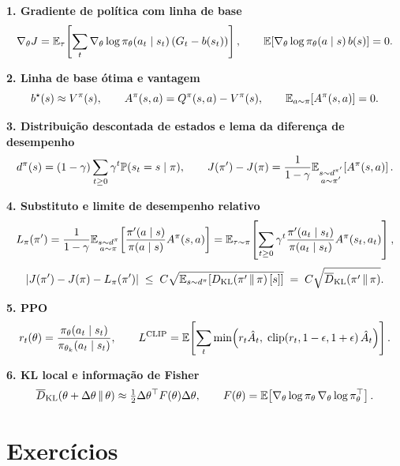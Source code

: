 \documentclass[11pt, a4paper]{article}
\newcommand{\Adv}{A}
\newcommand{\Ahat}{\hat{A}}
\newcommand{\polnovo}{\pol'}
\newcommand{\dpol}{d^{\pol}}
\newcommand{\dpolnovo}{d^{\pol'}}
\newcommand{\KLd}[2]{D_{\mathrm{KL}}\!\left(#1\,\|\,#2\right)}
\newcommand{\KLbar}{\overline{D}_{\mathrm{KL}}}
\DeclareMathOperator{\clipop}{clip}
\newcommand{\Lsub}[1]{L_{#1}}
\begin{document}
\begin{tcolorbox}[enhanced, colback=rlFundo, colframe=rlAzul!25, boxrule=0.8pt,
  arc=1.6mm, left=3mm, right=3mm, top=2.4mm, bottom=2.4mm, breakable]
\textbf{1. Gradiente de política com linha de base}
\[
  \nabla_\theta J = \mathbb{E}_\tau\!\left[\sum_{t}
    \nabla_\theta \log \pi_\theta(a_t\mid s_t)\left(G_t - b(s_t)\right)\right],
  \qquad
  \mathbb{E}\!\left[\nabla_\theta \log\pi_\theta(a\mid s)\, b(s)\right] = 0.
\]

\textbf{2. Linha de base ótima e vantagem}
\[
  b^\star(s) \approx \Vpi(s),
  \qquad
  \Adv^{\pol}(s,a) = \Qpi(s,a) - \Vpi(s),
  \qquad
  \E_{a\sim\pol}\!\left[\Adv^{\pol}(s,a)\right] = 0.
\]

\textbf{3. Distribuição descontada de estados e lema da diferença de desempenho}
\[
  \dpol(s) = (1-\gamma)\sum_{t\ge0}\gamma^t\Prob(s_t = s\mid\pol),
  \qquad
  J(\polnovo) - J(\pol) = \frac{1}{1-\gamma}
  \E_{\substack{s\sim\dpolnovo\\a\sim\polnovo}}\!\left[\Adv^{\pol}(s,a)\right].
\]

\textbf{4. Substituto e limite de desempenho relativo}
\[
  \Lsub{\pol}(\polnovo) = \frac{1}{1-\gamma}
  \E_{\substack{s\sim\dpol\\a\sim\pol}}\!\left[
  \frac{\polnovo(a\mid s)}{\pol(a\mid s)}\Adv^{\pol}(s,a)\right]
  = \E_{\tau\sim\pol}\!\left[\sum_{t\ge0}\gamma^t
  \frac{\polnovo(a_t\mid s_t)}{\pol(a_t\mid s_t)}\Adv^{\pol}(s_t,a_t)\right],
\]
\[
  \abs{J(\polnovo) - J(\pol) - \Lsub{\pol}(\polnovo)}
  \;\le\; C\sqrt{\E_{s\sim\dpol}\!\left[\KLd{\polnovo}{\pol}[s]\right]}
  \;=\; C\sqrt{\KLbar(\polnovo\,\|\,\pol)}.
\]

\textbf{5. PPO}
\[
  r_t(\theta) = \frac{\pol_\theta(a_t\mid s_t)}{\pol_{\theta_k}(a_t\mid s_t)},
  \qquad
  L^{\mathrm{CLIP}} = \E\!\left[\sum_t \min\!\Big(r_t\Ahat_t,\;
  \clipop(r_t, 1-\epsilon, 1+\epsilon)\,\Ahat_t\Big)\right].
\]

\textbf{6. KL local e informação de Fisher}
\[
  \KLbar(\theta+\Delta\theta\,\|\,\theta) \approx
  \tfrac12 \Delta\theta^\top F(\theta)\Delta\theta,
  \qquad
  F(\theta) = \E\!\left[\nabla_\theta\log\pol_\theta\,\nabla_\theta\log\pol_\theta^\top\right].
\]
\end{tcolorbox}

\section{Exercícios}
\end{document}
